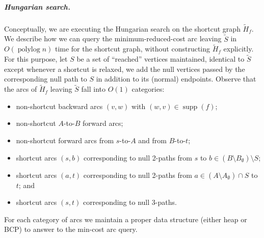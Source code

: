 \documentclass[a4paper,UKenglish]{socg-lipics-v2018}
\makeatletter
\def\note#1{\textcolor{red}{{#1}}}
\def\polylog{\mathop{\mathrm{polylog}}}
\def\eps{\varepsilon}
\DeclareMathOperator*{\argmin}{arg\,min}
\def\fsupply{\phi}
\def\supp{\operatorname{supp}}
\theoremstyle{plain}
\numberwithin{figure}{section}
\renewcommand{\paragraph}{\subparagraph}
\def\EMPH#1{\textcolor{BrickRed}{{\emph{#1}}}}
\def\n@te#1{\textsf{\boldmath \textbf{$\langle\!\langle$#1$\rangle\!\rangle$}}\leavevmode}
\def\note#1{\textcolor{red}{\n@te{#1}}}
\makeatother
\begin{document}
\paragraph{Hungarian search.}
%
%
Conceptually, we are executing the Hungarian search
on the shortcut graph $\tilde{H}_f$.
We describe how we can query the minimum-reduced-cost arc leaving $\tilde{S}$ in
$O(\polylog n)$ time for the shortcut graph, without constructing
$\tilde{H}_f$ explicitly.
For this purpose, let \EMPH{$S$} be a set of ``reached'' vertices maintained,
identical to $\tilde{S}$ except whenever a shortcut is relaxed, we add the null vertices passed by the corresponding null path to $S$ in addition to its (normal) endpoints.
%
Observe that the arcs of $\tilde{H}_f$ leaving $\tilde{S}$ fall into $O(1)$ categories:
\begin{itemize}\itemsep=0pt
\item non-shortcut backward arcs $(v, w)$ with $(w, v) \in \supp(f)$;
\item non-shortcut $A$-to-$B$ forward arcs;
\item non-shortcut forward arcs from $s$-to-$A$ and from $B$-to-$t$;
\item shortcut arcs $(s, b)$ corresponding to null 2-paths from $s$ to
	$b \in (B \setminus B_\emptyset) \setminus S$;
\item shortcut arcs $(a, t)$ corresponding to null 2-paths from
	$a \in (A \setminus A_\emptyset) \cap S$ to $t$; and
\item shortcut arcs $(s, t)$ corresponding to null 3-paths.
\end{itemize}
For each category of arcs we maintain a proper data structure (either heap or BCP) to answer to the min-cost arc query.
\end{document}
